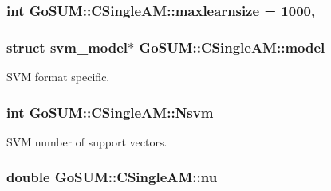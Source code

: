 \hypertarget{class_go_s_u_m_1_1_c_single_a_m_acf4f5351e6f159a04d1af48304934fc8}{
\subsubsection[{maxlearnsize}]{\setlength{\rightskip}{0pt plus 5cm}int Go\-S\-U\-M\-::\-C\-Single\-A\-M\-::maxlearnsize = 1000\hspace{0.3cm}{\ttfamily [static]}, {\ttfamily [protected]}}}\label{class_go_s_u_m_1_1_c_single_a_m_acf4f5351e6f159a04d1af48304934fc8}
\hypertarget{class_go_s_u_m_1_1_c_single_a_m_a512f4020c768225334ba3bcab462be10}{
\subsubsection[{model}]{\setlength{\rightskip}{0pt plus 5cm}struct svm\-\_\-model$\ast$ Go\-S\-U\-M\-::\-C\-Single\-A\-M\-::model\hspace{0.3cm}{\ttfamily [protected]}}}\label{class_go_s_u_m_1_1_c_single_a_m_a512f4020c768225334ba3bcab462be10}


S\-V\-M format specific. 

\hypertarget{class_go_s_u_m_1_1_c_single_a_m_ab2258ece370c0d08b80c3031c67f559e}{
\subsubsection[{Nsvm}]{\setlength{\rightskip}{0pt plus 5cm}int Go\-S\-U\-M\-::\-C\-Single\-A\-M\-::\-Nsvm\hspace{0.3cm}{\ttfamily [protected]}}}\label{class_go_s_u_m_1_1_c_single_a_m_ab2258ece370c0d08b80c3031c67f559e}


S\-V\-M number of support vectors. 

\hypertarget{class_go_s_u_m_1_1_c_single_a_m_a6af8bb4fec805a9f936bcfee61049238}{
\subsubsection[{nu}]{\setlength{\rightskip}{0pt plus 5cm}double Go\-S\-U\-M\-::\-C\-Single\-A\-M\-::nu\hspace{0.3cm}{\ttfamily [protected]}}}\label{class_go_s_u_m_1_1_c_single_a_m_a6af8bb4fec805a9f936bcfee61049238}


